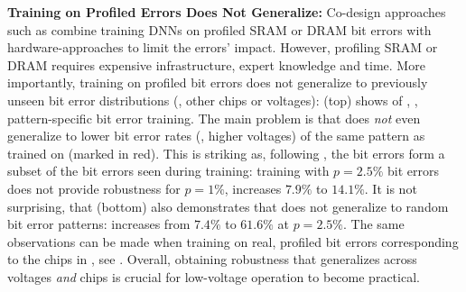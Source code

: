 \textbf{Training on Profiled Errors Does Not Generalize:}
%
Co-design approaches such as \cite{KimDATE2018,KoppulaMICRO2019} combine training DNNs on profiled SRAM or DRAM bit errors with hardware-approaches to limit the errors' impact.
However, profiling SRAM or DRAM requires expensive infrastructure, expert knowledge and time. 
More importantly, training on profiled bit errors does not generalize to previously unseen bit error distributions (\eg, other chips or voltages):  (top) shows \RTE of \Pattern, \ie, pattern-specific bit error training. The main problem is that \Pattern does \emph{not} even generalize to lower bit error rates (\ie, higher voltages) of the same pattern as trained on (marked in {\color{colorbrewer1}red}). This is striking as, following , the bit errors form a subset of the bit errors seen during training: training with $p = 2.5\%$ bit errors does not provide robustness for $p = 1\%$, \RTE increases $7.9\%$ to $14.1\%$. It is not surprising, that  (bottom) also demonstrates that \Pattern does not generalize to random bit error patterns: \RTE increases from $7.4\%$ to $61.6\%$ at $p = 2.5\%$. The same observations can be made when training on real, profiled bit errors corresponding to the chips in , see .
Overall, obtaining robustness that generalizes across voltages \emph{and} chips is crucial for low-voltage operation to become practical.

